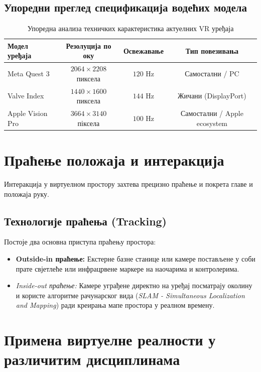 \documentclass[12pt,a4paper]{article}
\begin{document}
\subsection{Упоредни преглед спецификација водећих модела}

\begin{table}[h]
\centering
\caption{Упоредна анализа техничких карактеристика актуелних VR уређаја}
\vspace{0.2cm}
\begin{tabular}{|l|c|c|c|}
\hline
\textbf{Модел уређаја} & \textbf{Резолуција по оку} & \textbf{Освежавање} & \textbf{Тип повезивања} \\ \hline
Meta Quest 3 & $2064 \times 2208$ пиксела & $120 \text{ Hz}$ & Самостални / PC \\ \hline
Valve Index & $1440 \times 1600$ пиксела & $144 \text{ Hz}$ & Жичани (DisplayPort) \\ \hline
Apple Vision Pro & $3664 \times 3140$ піксела & $100 \text{ Hz}$ & Самостални / Apple ecosystem \\ \hline
\end{tabular}
\end{table}

\section{Праћење положаја и интеракција}

Интеракција у виртуелном простору захтева прецизно праћење и покрета главе и положаја руку.

\subsection{Технологије праћења (Tracking)}
Постоје два основна приступа праћењу простора:
\begin{itemize}
    \item \textbf{Outside-in праћење:} Екстерне базне станице или камере постављене у соби прате свјетлеће или инфрацрвене маркере на наочарима и контролерима.
    \item \textit{Inside-out праћење:} Камере уграђене директно на уређај посматрају околину и користе алгоритме рачунарског вида (\textit{SLAM - Simultaneous Localization and Mapping}) ради креирања мапе простора у реалном времену.
\end{itemize}

\section{Примена виртуелне реалности у различитим дисциплинама}
\end{document}

